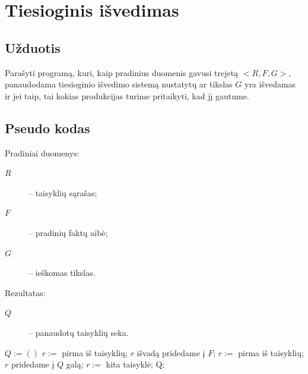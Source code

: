 \chapter{Tiesioginis išvedimas}

\section{Užduotis}

Parašyti programą, kuri, kaip pradinius duomenis gavusi trejetą
$<R, F, G>$, panaudodama tiesioginio išvedimo sistemą nustatytų
ar tikslas $G$ yra išvedamas ir jei taip, tai kokias produkcijas
turime pritaikyti, kad jį gautume.

\section{Pseudo kodas}

\label{sec:fc:pseudo}

Pradiniai duomenys:
\begin{description}
  \item[$R$] – taisyklių sąrašas;
  \item[$F$] – pradinių faktų aibė;
  \item[$G$] – ieškomas tikslas.
\end{description}

Rezultatas:
\begin{description}
  \item[$Q$] – panaudotų taisyklių seka.
\end{description}

\begin{algorithmic}[1]
    \State $Q := \left(  \right)$
    \State $r :=$ pirma iš taisyklių;
                                        \label{fc:pseudo:while_condition}
                                        \label{fc:pseudo:if_condition}
        \State $r$ išvadą pridedame į $F$;
                                        \label{fc:pseudo:add_fact}
        \State $r := $ pirma iš taisyklių;
                                        \label{fc:pseudo:start}
        \State $r$ pridedame į $Q$ galą;
                                        \label{fc:pseudo:add_rule}
      \Else
        \State $r := $ kita taisyklė;   \label{fc:pseudo:next_rule}
      \EndIf
    \EndWhile
    \State \Return Q;
  \EndFunction
\end{algorithmic}

